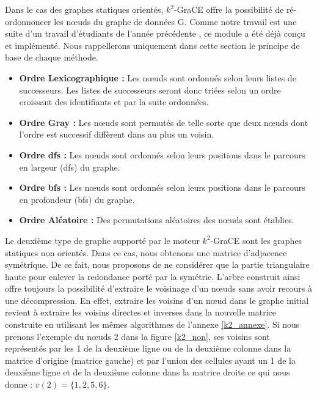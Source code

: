 \documentclass[a4paper,oneside,12pt]{report}
\theoremstyle{definition}
\begin{document}
			
			Dans le cas des graphes statiques orientés, $k^2$-GraCE offre la possibilité de ré-ordonnoncer les nœuds du graphe de données G.
			Comme notre travail est une suite d'un travail d'étudiants de l'année précédente \citep{master2017}, ce module a été déjà conçu et implémenté. Nous rappellerons uniquement dans cette section le principe de base de chaque méthode. 
			
			\begin{itemize}[label=$\bullet$]
\item\textbf{Ordre Lexicographique :} Les nœuds sont ordonnés selon leurs listes de successeurs. Les listes de successeurs seront donc triées selon un ordre croissant des identifiants et par la suite ordonnées.

	
\item\textbf{Ordre Gray :} Les nœuds sont permutés de telle sorte que deux nœuds dont l'ordre est successif diffèrent dans au plus un voisin. 
\item\textbf{Ordre \gls{dfs} :} Les nœuds sont ordonnés selon leurs positions dans le parcours en largeur (\gls{dfs}) du graphe.  
\item\textbf{Ordre \gls{bfs} :} Les nœuds sont ordonnés selon leurs positions dans le parcours en profondeur (\gls{bfs}) du graphe. 
\item\textbf{Ordre Aléatoire :} Des permutations aléatoires des nœuds sont établies.
			
			\end{itemize}
		
	Le deuxième type de graphe supporté par le moteur $k^2$-GraCE sont les graphes statiques non orientés. Dans ce cas, nous obtenons une matrice d'adjacence symétrique. De ce fait, nous proposons de ne considérer que la partie triangulaire haute pour enlever la redondance porté par la symétrie. L'arbre construit ainsi offre toujours la possibilité d'extraire le voisinage d'un nœuds sans avoir recours à une décompression. En effet, extraire les voisins d'un nœud dans le graphe initial revient à extraire les voisins directes et inverses dans la nouvelle matrice construite en utilisant les mêmes algorithmes de l'annexe \ref{k2_annexe}.
	 Si nous prenons l'exemple du nœuds 2 dans la figure \ref{k2_non}, ses voisins sont représentés par les 1 de la deuxième ligne ou de la deuxième colonne dans la matrice d'origine (matrice gauche) et par l'union des cellules ayant un 1 de la deuxième ligne et de la deuxième colonne dans la matrice droite ce qui nous donne : $v(2) = \{1, 2, 5,6\}$.
	
\end{document}
